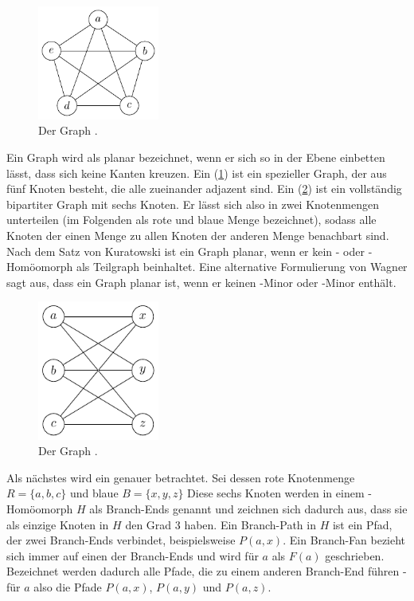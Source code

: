 \begin{figure}
  \includegraphics[width=4cm]{bilder/K_5.pdf}
  \caption{Der Graph \kf.}
  \label{fig:K5}
\end{figure}
Ein Graph wird als planar bezeichnet, wenn er sich so in der Ebene einbetten lässt, dass sich keine Kanten kreuzen.
Ein \kf (\sAbb \ref{fig:K5}) ist ein spezieller Graph, der aus fünf Knoten besteht, die alle zueinander adjazent sind.
Ein \kdd (\sAbb \ref{fig:K33}) ist ein vollständig bipartiter Graph mit sechs Knoten.
Er lässt sich also in zwei Knotenmengen unterteilen (im Folgenden als rote und blaue Menge bezeichnet), sodass alle Knoten der einen Menge zu allen Knoten der anderen Menge benachbart sind.
Nach dem Satz von Kuratowski ist ein Graph planar, wenn er kein \kf- oder \kdd-Homöomorph als Teilgraph beinhaltet.
Eine alternative Formulierung von Wagner sagt aus, dass ein Graph planar ist, wenn er keinen \kf-Minor oder \kdd-Minor enthält.\cite{Die12}
\begin{figure}
  \includegraphics[width=4cm]{bilder/K_33.pdf}
  \caption{Der Graph \kdd.}
  \label{fig:K33}
\end{figure}

Als nächstes wird ein \kdd genauer betrachtet.
Sei dessen rote Knotenmenge $R = \{a, b, c\}$ und blaue $B = \{x, y, z\}$
Diese sechs Knoten werden in einem \kdd-Homöomorph $H$ als Branch-Ends genannt und zeichnen sich dadurch aus, dass sie als einzige Knoten in $H$ den Grad 3 haben.
Ein Branch-Path in $H$ ist ein Pfad, der zwei Branch-Ends verbindet, beispielsweise $P(a, x)$.
Ein Branch-Fan bezieht sich immer auf einen der Branch-Ends und wird \zB für $a$ als $F(a)$ geschrieben.
Bezeichnet werden dadurch alle Pfade, die zu einem anderen Branch-End führen - für $a$ also die Pfade $P(a, x)$, $P(a, y)$ und $P(a, z)$.


